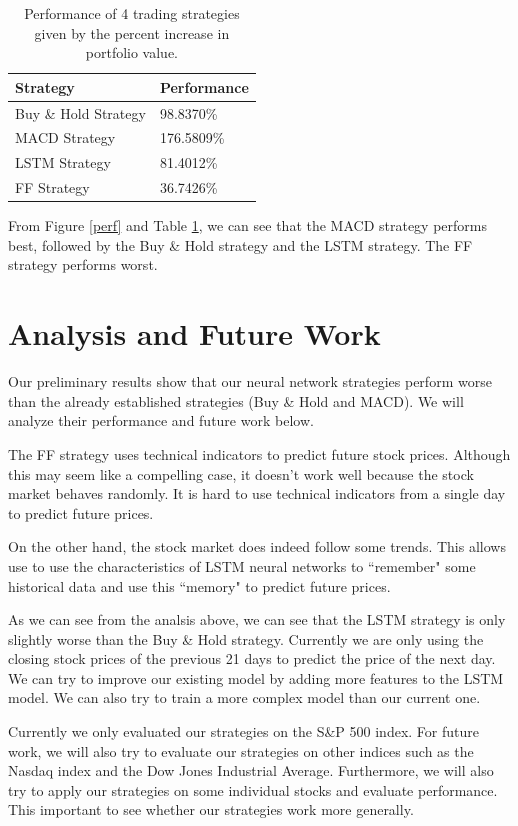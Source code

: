 \documentclass[10pt]{article}
\begin{document}
\begin{table}[H]
\centering
\begin{tabular}{| l | l |} 
\hline
Strategy & Performance \\
\hline
Buy \& Hold Strategy & 98.8370\% \\
MACD Strategy & 176.5809\% \\
LSTM Strategy & 81.4012\% \\
FF Strategy & 36.7426\% \\
\hline
\end{tabular}
\caption{Performance of 4 trading strategies given by the percent increase in portfolio value.}
\label{perftable}
\end{table}

From Figure \ref{perf} and Table \ref{perftable}, we can see that the MACD strategy performs best, followed by the Buy \& Hold strategy and the LSTM strategy. The FF strategy performs worst.


\section{Analysis and Future Work}

Our preliminary results show that our neural network strategies perform worse than the already established strategies (Buy \& Hold and MACD). We will analyze their performance and future work below.

The FF strategy uses technical indicators to predict future stock prices. Although this may seem like a compelling case, it doesn't work well because the stock market behaves randomly. It is hard to use technical indicators from a single day to predict future prices.

On the other hand, the stock market does indeed follow some trends. This allows use to use the characteristics of LSTM neural networks to ``remember" some historical data and use this ``memory" to predict future prices.

As we can see from the analsis above, we can see that the LSTM strategy is only slightly worse than the Buy \& Hold strategy. Currently we are only using the closing stock prices of the previous 21 days to predict the price of the next day. We can try to improve our existing model by adding more features to the LSTM model. We can also try to train a more complex model than our current one.

Currently we only evaluated our strategies on the S\&P 500 index. For future work, we will also try to evaluate our strategies on other indices such as the Nasdaq index and the Dow Jones Industrial Average. Furthermore, we will also try to apply our strategies on some individual stocks and evaluate performance. This important to see whether our strategies work more generally.
\end{document}
